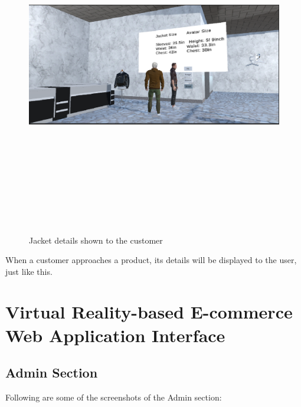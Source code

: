 \begin{figure}[H]
    \centering
    \includegraphics[width=15cm,height=15cm]{Figures/Environment/products.png}
    \caption{Jacket details shown to the customer}
    \label{fig:Product Details showing}
\end{figure}
\justifying
When a customer approaches a product, its details will be displayed to the user, just like this.
\section{Virtual Reality-based E-commerce Web Application Interface}
\subsection{Admin Section}
Following are some of the screenshots of the Admin section:
